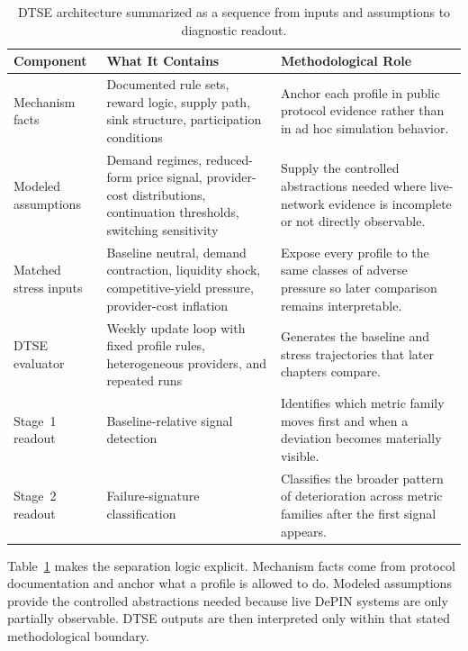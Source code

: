 \begin{table}[!htbp]
    \centering
    \footnotesize
    \setlength{\tabcolsep}{4pt}
    \renewcommand{\arraystretch}{1.1}
    \begin{tabularx}{\textwidth}{@{}>{\raggedright\arraybackslash}p{}>{\raggedright\arraybackslash}p{}X@{}}
        \toprule
        \textbf{Component} & \textbf{What It Contains} & \textbf{Methodological Role} \\
        \midrule
        Mechanism facts & Documented rule sets, reward logic, supply path, sink structure, participation conditions & Anchor each profile in public protocol evidence rather than in ad hoc simulation behavior. \\
        \addlinespace
        Modeled assumptions & Demand regimes, reduced-form price signal, provider-cost distributions, continuation thresholds, switching sensitivity & Supply the controlled abstractions needed where live-network evidence is incomplete or not directly observable. \\
        \addlinespace
        Matched stress inputs & Baseline neutral, demand contraction, liquidity shock, competitive-yield pressure, provider-cost inflation & Expose every profile to the same classes of adverse pressure so later comparison remains interpretable. \\
        \addlinespace
        DTSE evaluator & Weekly update loop with fixed profile rules, heterogeneous providers, and repeated runs & Generates the baseline and stress trajectories that later chapters compare. \\
        \addlinespace
        Stage~1 readout & Baseline-relative signal detection & Identifies which metric family moves first and when a deviation becomes materially visible. \\
        \addlinespace
        Stage~2 readout & Failure-signature classification & Classifies the broader pattern of deterioration across metric families after the first signal appears. \\
        \bottomrule
    \end{tabularx}
    \caption[DTSE architecture overview]{DTSE architecture summarized as a sequence from inputs and assumptions to diagnostic readout.}
    \label{tab:dtse_architecture_overview}
\end{table}

Table~\ref{tab:dtse_architecture_overview} makes the separation logic explicit. Mechanism facts come from protocol documentation and anchor what a profile is allowed to do. Modeled assumptions provide the controlled abstractions needed because live DePIN systems are only partially observable. DTSE outputs are then interpreted only within that stated methodological boundary.

